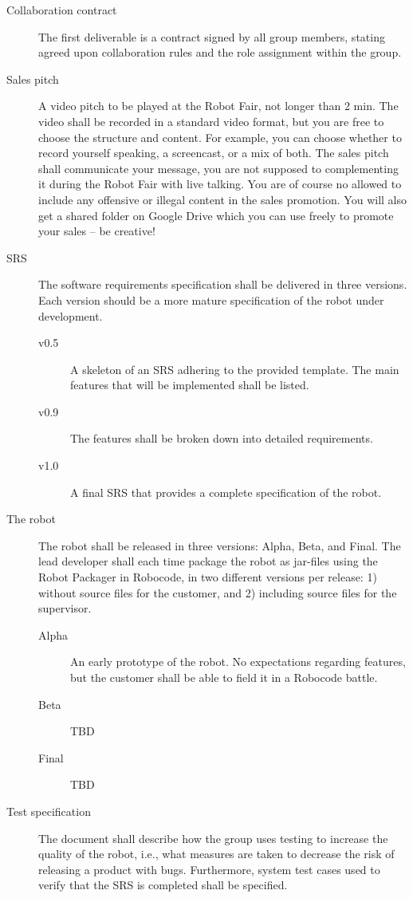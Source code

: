 \documentclass{scrreprt}
\begin{document}
\begin{description}
\item[Collaboration contract] The first deliverable is a contract signed by all group members, stating agreed upon collaboration rules and the role assignment within the group.
\item[Sales pitch] A video pitch to be played at the Robot Fair, not longer than 2 min. The video shall be recorded in a standard video format, but you are free to choose the structure and content. For example, you can choose whether to record yourself speaking, a screencast, or a mix of both. The sales pitch shall communicate your message, you are not supposed to complementing it during the Robot Fair with live talking. You are of course no allowed to include any offensive or illegal content in the sales promotion. You will also get a shared folder on Google Drive which you can use freely to promote your sales -- be creative!
\item[SRS] The software requirements specification shall be delivered in three versions. Each version should be a more mature specification of the robot under development.
\begin{description}
\item[v0.5] A skeleton of an SRS adhering to the provided template. The main features that will be implemented shall be listed.
\item[v0.9] The features shall be broken down into detailed requirements.
\item[v1.0] A final SRS that provides a complete specification of the robot.
\end{description}
\item[The robot] The robot shall be released in three versions: Alpha, Beta, and Final. The lead developer shall each time package the robot as jar-files using the Robot Packager in Robocode, in two different versions per release: 1) without source files for the customer, and 2) including source files for the supervisor.
\begin{description}
\item[Alpha] An early prototype of the robot. No expectations regarding features, but the customer shall be able to field it in a Robocode battle.
\item[Beta] TBD
\item[Final] TBD
\end{description}
\item[Test specification] The document shall describe how the group uses testing to increase the quality of the robot, i.e., what measures are taken to decrease the risk of releasing a product with bugs. Furthermore, system test cases used to verify that the SRS is completed shall be specified.

\end{description}
\end{document}
